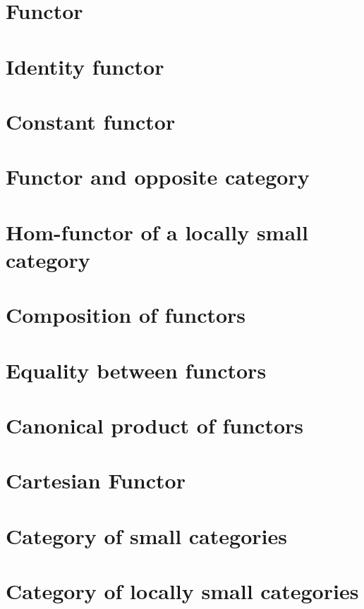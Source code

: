 \section{Functor}
    
\section{Identity functor}
    
\section{Constant functor}
    
\section{Functor and opposite category}
    
\section{Hom-functor of a locally small category}
    
\section{Composition of functors}
    
\section{Equality between functors}
    
\section{Canonical product of functors}
    
\section{Cartesian Functor}
    
\section{Category of small categories}
    
\section{Category of locally small categories}
    
